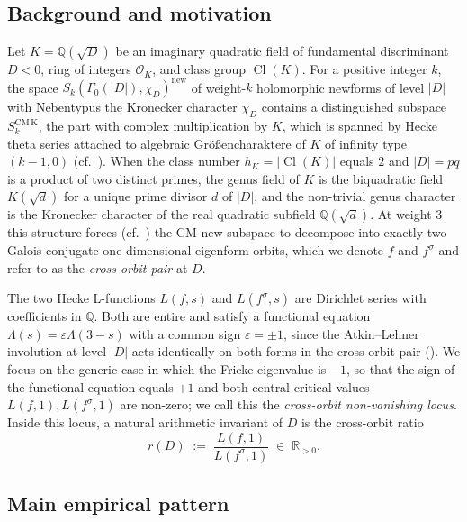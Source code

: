 \documentclass[11pt]{amsart}
\theoremstyle{definition}
\theoremstyle{remark}
\DeclareMathOperator{\Cl}{Cl}
\newcommand{\Q}{\mathbb{Q}}
\newcommand{\R}{\mathbb{R}}
\newcommand{\OK}{\mathcal{O}_K}
\newcommand{\chiD}{\chi_D}
\begin{document}
\subsection{Background and motivation}\label{ssec:bg}

Let \(K = \Q(\sqrt{D})\) be an imaginary quadratic field of
fundamental discriminant \(D < 0\), ring of integers \(\OK\), and
class group \(\Cl(K)\). For a positive integer \(k\), the space
\(S_{k}(\Gamma_{0}(|D|), \chiD)^{\mathrm{new}}\) of weight-\(k\)
holomorphic newforms of level \(|D|\) with Nebentypus the Kronecker
character \(\chiD\) contains a distinguished subspace
\(S_{k}^{\mathrm{CM\,K}}\), the part with complex multiplication by
\(K\), which is spanned by Hecke theta series attached to algebraic
Gr\"o\ss encharaktere of \(K\) of infinity type \((k-1, 0)\)
(cf.\ \cite{Shimura1971,Ribet1977}). When the class number
\(h_{K} = |\Cl(K)|\) equals \(2\) and \(|D| = pq\) is a product of two
distinct primes, the genus field of \(K\) is the biquadratic field
\(K(\sqrt{d})\) for a unique prime divisor \(d\) of \(|D|\), and the
non-trivial genus character is the Kronecker character of the real
quadratic subfield \(\Q(\sqrt{d})\). At weight \(3\) this structure
forces (cf.\ ) the CM new subspace to decompose into
exactly two Galois-conjugate one-dimensional eigenform orbits, which
we denote \(f\) and \(f^{\sigma}\) and refer to as the
\emph{cross-orbit pair} at \(D\).

The two Hecke L-functions \(L(f, s)\) and \(L(f^{\sigma}, s)\) are
Dirichlet series with coefficients in \(\Q\). Both are entire and
satisfy a functional equation \(\Lambda(s) = \varepsilon
\Lambda(3 - s)\) with a common sign \(\varepsilon = \pm 1\), since the
Atkin--Lehner involution at level \(|D|\) acts identically on both
forms in the cross-orbit pair (). We focus on
the generic case in which the Fricke eigenvalue is \(-1\), so that
the sign of the functional equation equals \(+1\) and both central
critical values \(L(f, 1), L(f^{\sigma}, 1)\) are non-zero; we call
this the \emph{cross-orbit non-vanishing locus}. Inside this locus, a
natural arithmetic invariant of \(D\) is the cross-orbit ratio
\begin{equation}\label{eq:ratio-def}
  r(D) \;:=\; \frac{L(f, 1)}{L(f^{\sigma}, 1)} \;\in\; \R_{>0} .
\end{equation}

\subsection{Main empirical pattern}\label{ssec:main-empirical}
\end{document}
